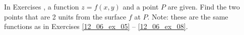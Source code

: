 {\noindent In Exercises}
{, a function $z=f(x,y)$ and a point $P$ are given. Find the two points that are 2 units from the surface $f$ at $P$. Note: these are the same functions as in  Exercises \ref{12_06_ex_05} -- \ref{12_06_ex_08}.
}
